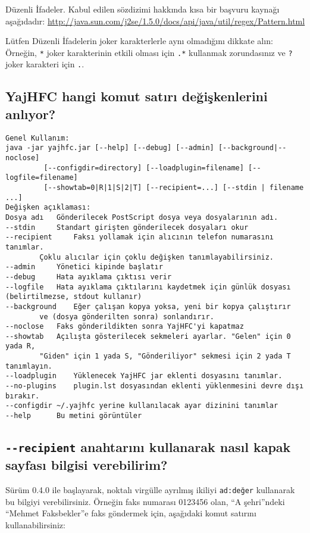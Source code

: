 \documentclass[a4paper,10pt]{scrartcl}
\begin{document}
Düzenli İfadeler. Kabul edilen sözdizimi hakkında kısa bir başvuru kaynağı aşağıdadır:
\url{http://java.sun.com/j2se/1.5.0/docs/api/java/util/regex/Pattern.html}

Lütfen Düzenli İfadelerin joker karakterlerle aynı olmadığını dikkate alın:
Örneğin, \verb.*. joker karakterinin etkili olması için \verb#.*# kullanmak zorundasınız 
ve \verb#?# joker karakteri için \verb#.#.

\subsection{YajHFC hangi komut satırı değişkenlerini anlıyor?}

\begin{verbatim}
Genel Kullanım:
java -jar yajhfc.jar [--help] [--debug] [--admin] [--background|--noclose]
         [--configdir=directory] [--loadplugin=filename] [--logfile=filename]
         [--showtab=0|R|1|S|2|T] [--recipient=...] [--stdin | filename ...]
Değişken açıklaması:
Dosya adı	Gönderilecek PostScript dosya veya dosyalarının adı.
--stdin 	Standart girişten gönderilecek dosyaları okur
--recipient 	Faksı yollamak için alıcının telefon numarasını tanımlar.
		Çoklu alıcılar için çoklu değişken tanımlayabilirsiniz.
--admin		Yönetici kipinde başlatır
--debug		Hata ayıklama çıktısı verir
--logfile	Hata ayıklama çıktılarını kaydetmek için günlük dosyası (belirtilmezse, stdout kullanır)
--background	Eğer çalışan kopya yoksa, yeni bir kopya çalıştırır
		ve (dosya gönderilten sonra) sonlandırır.
--noclose	Faks gönderildikten sonra YajHFC'yi kapatmaz
--showtab	Açılışta gösterilecek sekmeleri ayarlar. "Gelen" için 0 yada R, 
		"Giden" için 1 yada S, "Gönderiliyor" sekmesi için 2 yada T tanımlayın.
--loadplugin	Yüklenecek YajHFC jar eklenti dosyasını tanımlar.
--no-plugins	plugin.lst dosyasından eklenti yüklenmesini devre dışı bırakır.
--configdir	~/.yajhfc yerine kullanılacak ayar dizinini tanımlar
--help		Bu metini görüntüler
\end{verbatim}




\subsection{ \texttt{-{-}recipient} anahtarını kullanarak nasıl kapak sayfası bilgisi verebilirim?}

Sürüm 0.4.0 ile başlayarak, noktalı virgülle ayrılmış ikiliyi \texttt{ad:değer} kullanarak bu bilgiyi verebilirsiniz.
Örneğin faks numarası 0123456 olan, ``A şehri''ndeki ``Mehmet Faksbekler''e faks göndermek için, aşağıdaki komut satırını kullanabilirsiniz:
\end{document}
